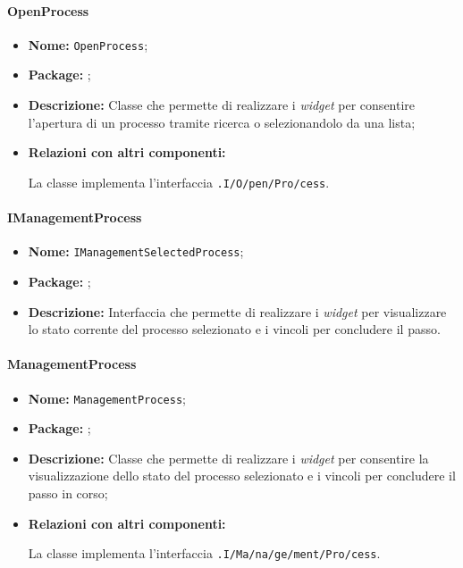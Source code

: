 \paragraph{OpenProcess}
\begin{flushleft}
\begin{itemize}
\item \textbf{Nome:} \texttt{OpenProcess};
\item \textbf{Package:} \texttt{\viewUser{}};
\item \textbf{Descrizione:} Classe che permette di realizzare i \textit{widget} per consentire l'apertura di un processo tramite ricerca o selezionandolo da una lista;
\item \textbf{Relazioni con altri componenti:}
\begin{sloppypar}
La classe implementa l'interfaccia \texttt{\viewUser{}.I\fshyp{}O\fshyp{}pen\fshyp{}Pro\fshyp{}cess}.
\end{sloppypar}
\end{itemize}
\end{flushleft}

\paragraph{IManagementProcess}
\begin{itemize}
\item \textbf{Nome:} \texttt{IManagementSelectedProcess};
\item \textbf{Package:} \texttt{\viewUser{}};
\item \textbf{Descrizione:} Interfaccia che permette di realizzare i \textit{widget} per visualizzare lo stato corrente del processo selezionato e i vincoli per concludere il passo.
\end{itemize}

\paragraph{ManagementProcess}
\begin{flushleft}
\begin{itemize}
\item \textbf{Nome:} \texttt{ManagementProcess};
\item \textbf{Package:} \texttt{\viewUser{}};
\item \textbf{Descrizione:} Classe che permette di realizzare i \textit{widget} per consentire la visualizzazione dello stato del processo selezionato e i vincoli per concludere il passo in corso;
\item \textbf{Relazioni con altri componenti:}
\begin{sloppypar}
La classe implementa l'interfaccia \texttt{\viewUser{}.I\fshyp{}Ma\fshyp{}na\fshyp{}ge\fshyp{}ment\fshyp{}Pro\fshyp{}cess}.
\end{sloppypar}
\end{itemize}
\end{flushleft}

